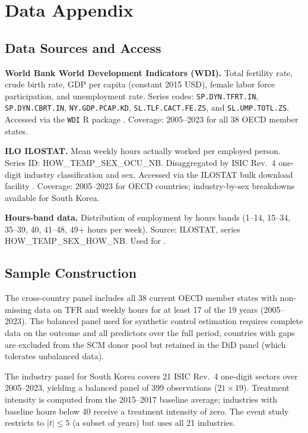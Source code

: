 \documentclass[12pt]{article}
\begin{document}
\label{apep_main_text_end}
\newpage


\newpage
\appendix

\section{Data Appendix}
\label{sec:data_appendix}

\subsection{Data Sources and Access}

\textbf{World Bank World Development Indicators (WDI).} Total fertility rate, crude birth rate, GDP per capita (constant 2015 USD), female labor force participation, and unemployment rate. Series codes: \texttt{SP.DYN.TFRT.IN}, \texttt{SP.DYN.CBRT.IN}, \texttt{NY.GDP.PCAP.KD}, \texttt{SL.TLF.CACT.FE.ZS}, and \texttt{SL.UMP.TOTL.ZS}. Accessed via the \texttt{WDI} R package \citep{worldbank2024wdi}. Coverage: 2005--2023 for all 38 OECD member states.

\textbf{ILO ILOSTAT.} Mean weekly hours actually worked per employed person. Series ID: HOW\_TEMP\_SEX\_OCU\_NB. Disaggregated by ISIC Rev.~4 one-digit industry classification and sex. Accessed via the ILOSTAT bulk download facility \citep{ilo2024ilostat}. Coverage: 2005--2023 for OECD countries; industry-by-sex breakdowns available for South Korea.

\textbf{Hours-band data.} Distribution of employment by hours bands (1--14, 15--34, 35--39, 40, 41--48, 49+ hours per week). Source: ILOSTAT, series HOW\_TEMP\_SEX\_HOW\_NB. Used for .

\subsection{Sample Construction}

The cross-country panel includes all 38 current OECD member states with non-missing data on TFR and weekly hours for at least 17 of the 19 years (2005--2023). The balanced panel used for synthetic control estimation requires complete data on the outcome and all predictors over the full period; countries with gaps are excluded from the SCM donor pool but retained in the DiD panel (which tolerates unbalanced data).

The industry panel for South Korea covers 21 ISIC Rev.~4 one-digit sectors over 2005--2023, yielding a balanced panel of 399 observations ($21 \times 19$). Treatment intensity is computed from the 2015--2017 baseline average; industries with baseline hours below 40 receive a treatment intensity of zero. The event study restricts to $|t| \leq 5$ (a subset of years) but uses all 21 industries.
\end{document}
